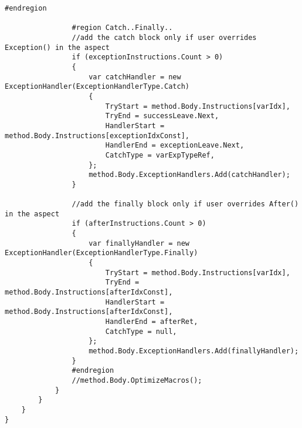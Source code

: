 \begin{lstlisting}[caption={../buffalo/Injectors/MethodBoundaryInjector.cs}, label=../buffalo/Injectors/MethodBoundaryInjector.cs, frame=tb, basicstyle=\scriptsize]
                #endregion

                #region Catch..Finally..
                //add the catch block only if user overrides Exception() in the aspect
                if (exceptionInstructions.Count > 0)
                {
                    var catchHandler = new ExceptionHandler(ExceptionHandlerType.Catch)
                    {
                        TryStart = method.Body.Instructions[varIdx],
                        TryEnd = successLeave.Next,
                        HandlerStart = method.Body.Instructions[exceptionIdxConst],
                        HandlerEnd = exceptionLeave.Next,
                        CatchType = varExpTypeRef,
                    };
                    method.Body.ExceptionHandlers.Add(catchHandler);
                }

                //add the finally block only if user overrides After() in the aspect
                if (afterInstructions.Count > 0)
                {
                    var finallyHandler = new ExceptionHandler(ExceptionHandlerType.Finally)
                    {
                        TryStart = method.Body.Instructions[varIdx],
                        TryEnd = method.Body.Instructions[afterIdxConst],
                        HandlerStart = method.Body.Instructions[afterIdxConst],
                        HandlerEnd = afterRet,
                        CatchType = null,
                    };
                    method.Body.ExceptionHandlers.Add(finallyHandler);
                }
                #endregion
                //method.Body.OptimizeMacros();
            }
        }
    }
}
\end{lstlisting}

